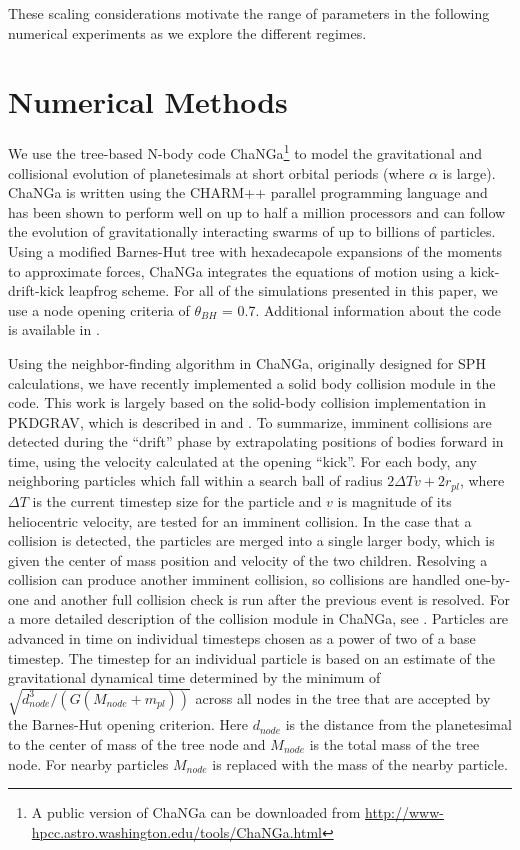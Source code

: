 \documentclass[twocolumn]{aastex63}
\begin{document}
These scaling considerations motivate the range of parameters in the
following numerical experiments as we explore the different regimes.

\section{Numerical Methods}\label{sec:methods}

We use the tree-based N-body code {\sc ChaNGa}\footnote{A public version of {\sc ChaNGa} can be downloaded from \url{http://www-hpcc.astro.washington.edu/tools/ChaNGa.html}} to model the gravitational and collisional evolution of planetesimals at short orbital periods (where $\alpha$ is large). {\sc ChaNGa} is written using the {\sc CHARM++} parallel programming language and has been shown to perform well on up to half a million processors \citep{menon15} and can follow the evolution of gravitationally interacting swarms of up to billions of particles. Using a modified Barnes-Hut tree with hexadecapole expansions of the moments to approximate forces, {\sc ChaNGa} integrates the equations of motion using a kick-drift-kick leapfrog scheme. For all of the simulations presented in this paper, we use a node opening criteria of $\theta_{BH}$ = 0.7. Additional information about the code is available in \citep{jetley08,menon15}.

Using the neighbor-finding algorithm in {\sc ChaNGa}, originally
designed for SPH calculations, we have recently implemented a solid
body collision module in the code.  This work is largely based on the
solid-body collision implementation in {\sc PKDGRAV}, which is
described in \citet{richardson94} and \citet{richardson00}. To
summarize, imminent collisions are detected during the ``drift'' phase
by extrapolating positions of bodies forward in time, using the
velocity calculated at the opening ``kick''. For each body, any
neighboring particles which fall within a search ball of radius
$2 \Delta T v + 2 r_{pl}$, where $\Delta T$ is the current timestep size
for the particle and $v$ is magnitude of its heliocentric velocity,
 are tested for an imminent collision. In the case that
a collision is detected, the particles are merged into a single larger
body, which is given the center of mass position and velocity of the
two children. Resolving a collision can produce another imminent
collision, so collisions are handled one-by-one and another full
collision check is run after the previous event is resolved. For a
more detailed description of the collision module in {\sc ChaNGa}, see
\citep{wallace19}.
Particles are advanced in time on individual timesteps chosen as a
power of two of a base timestep.  The timestep for an individual
particle is based on an estimate of the gravitational dynamical time
determined by the minimum of $\sqrt{d_{node}^3/(G(M_{node} + m_{pl}))}$
across all nodes in the tree that are accepted by the Barnes-Hut
opening criterion.  Here $d_{node}$ is the distance from the
planetesimal to the center of mass of the tree node and $M_{node}$ is
the total mass of the tree node.  For nearby particles $M_{node}$ is
replaced with the mass of the nearby particle.
\end{document}
